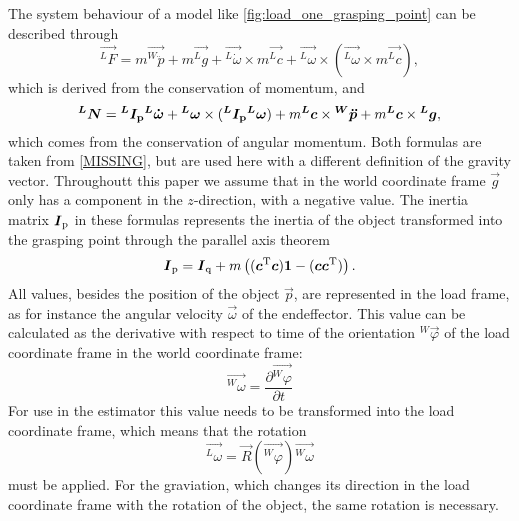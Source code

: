 The system behaviour of a model like \ref{fig:load_one_grasping_point} can be described through 
\begin{equation}
	\vec{^LF} = m \vec{^W\ddot{p}} + m \vec{^Lg} + \vec{^L\dot{\omega}} \times m \vec{^Lc} + \vec{^L\omega} \times (\vec{^L\omega} \times m \vec{^Lc}),
	\label{eq:force}
\end{equation}
which is derived from the conservation of momentum, and
\begin{equation}
	\boldsymbol{^LN} = \boldsymbol{^LI_{\mathrm{p}}} \boldsymbol{^L\dot{\omega}} + \boldsymbol{^L\omega} \times (\boldsymbol{^LI_{\mathrm{p}}} \boldsymbol{^L\omega}) + m \boldsymbol{^Lc} \times \boldsymbol{^W\ddot{p}} + m \boldsymbol{^Lc} \times \boldsymbol{^Lg},
	\label{eq:torque}
\end{equation}
which comes from the conservation of angular momentum. Both formulas are taken from \ref{MISSING}, but are used here with a different definition of the gravity vector. Throughoutt this paper we assume that in the world coordinate frame $\vec g$ only has a component in the $z$-direction, with a negative value. The inertia matrix $\boldsymbol{I}_{\mathrm{p}}$ in these formulas represents the inertia of the object transformed into the grasping point through the parallel axis theorem
\begin{equation}
	\boldsymbol{I}_{\mathrm{p}} = \boldsymbol{I}_{\mathrm{q}} + m \left( (\boldsymbol{c}^{\mathrm{T}} \boldsymbol{c}) \boldsymbol{1} - (\boldsymbol{c} \boldsymbol{c}^{\mathrm{T}}) \right).
\end{equation}
All values, besides the position of the object $\vec p$, are represented in the load frame, as for instance the angular velocity $\vec \omega$ of the endeffector. This value can be calculated as the derivative with respect to time of the orientation $^W\vec{\varphi}$ of the load coordinate frame in the world coordinate frame:
\begin{equation}
	\vec{^W\omega} = \frac{\partial \vec{^W\varphi}}{\partial t}
\end{equation}
For use in the estimator this value needs to be transformed into the load coordinate frame, which means that the rotation
\begin{equation}
	\vec{^L\omega} = \vec{R}(\vec{^W\varphi}) \vec{^W\omega}
\end{equation}
must be applied. For the graviation, which changes its direction in the load coordinate frame with the rotation of the object, the same rotation is necessary.

